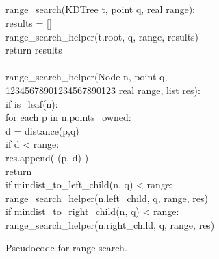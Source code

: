 \begin{figure}
\begin{pcode}
 \\
 \\
 \\
 \\
\func range\_search(KDTree t, point q, real range): \\
\>   results = []  \\
\>   range\_search\_helper(t.root, q, range, results) \\
\>   return results \\
\\
\func range\_search\_helper(Node n, point q, \\
  12345678901234567890123\=\kill
  \> real range, list res): \\
  \tabstops
\>   if is\_leaf(n): \\
 \>\>     for each p in n.points\_owned: \\
\>\>\>         d = distance(p,q) \\
\>\>\>         if d < range: \\
\>\>\>\>            res.append( (p, d) ) \\
\>\>      return \\
\>   if mindist\_to\_left\_child(n, q) < range: \\
\>\>      range\_search\_helper(n.left\_child, \spc q, range, res) \\
\>   if mindist\_to\_right\_child(n, q) < range: \\
\>\>      range\_search\_helper(n.right\_child, q, range, res)
\end{pcode}
\caption{Pseudocode for range search.}
\label{code:rangesearch}
\end{figure}


